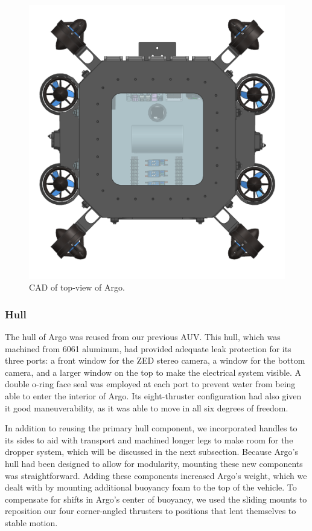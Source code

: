 \documentclass[conference]{IEEEtran}
\begin{document}
\begin{figure}[h]
    \centerline{\includegraphics[scale=0.3]{images/Top_no foam.PNG}}
    \caption{CAD of top-view of Argo.}
    \label{fig:sub3}
\end{figure}

\subsubsection{Hull}
\label{sssec:hull}
The hull of Argo was reused from our previous AUV. This hull, which was machined from 6061 aluminum, had provided adequate leak protection for its three ports: a front window for the ZED stereo camera, a window for the bottom camera, and a larger window on the top to make the electrical system visible. A double o-ring face seal was employed at each port to prevent water from being able to enter the interior of Argo. Its eight-thruster configuration had also given it good maneuverability, as it was able to move in all six degrees of freedom. 


In addition to reusing the primary hull component, we incorporated handles to its sides to aid with transport and machined longer legs to make room for the dropper system, which will be discussed in the next subsection. Because Argo’s hull had been designed to allow for modularity, mounting these new components was straightforward. Adding these components increased Argo’s weight, which we dealt with by mounting additional buoyancy foam to the top of the vehicle. To compensate for shifts in Argo’s center of buoyancy, we used the sliding mounts to reposition our four corner-angled thrusters to positions that lent themselves to stable motion. 
\end{document}

